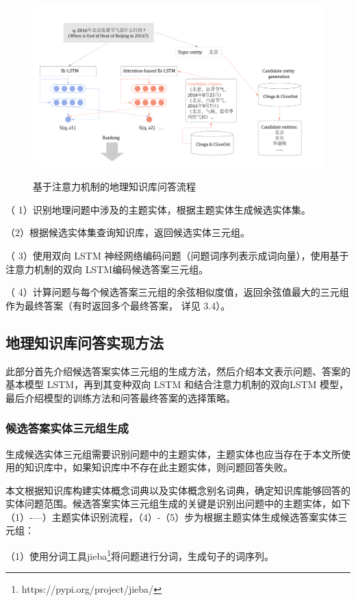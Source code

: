 \begin{figure}[!htb]
	\centering\includegraphics[height=7cm]{resource/qa_overview}
	\caption{基于注意力机制的地理知识库问答流程}
	\label{fig:qa_overview}
\end{figure}

（ 1）识别地理问题中涉及的主题实体，根据主题实体生成候选实体集。

（2）根据候选实体集查询知识库，返回候选实体三元组。

（ 3）使用双向 LSTM 神经网络编码问题（问题词序列表示成词向量），使用基于注意力机制的双向 LSTM编码候选答案三元组。

（ 4）计算问题与每个候选答案三元组的余弦相似度值，返回余弦值最大的三元组作为最终答案（有时返回多个最终答案， 详见 3.4）。

\subsection{地理知识库问答实现方法}
此部分首先介绍候选答案实体三元组的生成方法，然后介绍本文表示问题、答案的基本模型 LSTM，再到其变种双向 LSTM 和结合注意力机制的双向LSTM 模型，最后介绍模型的训练方法和问答最终答案的选择策略。

\subsubsection{候选答案实体三元组生成}
生成候选实体三元组需要识别问题中的主题实体，主题实体也应当存在于本文所使用的知识库中，如果知识库中不存在此主题实体，则问题回答失败。

本文根据知识库构建实体概念词典以及实体概念别名词典，确定知识库能够回答的实体问题范围。候选答案实体三元组生成的关键是识别出问题中的主题实体，如下（1）-—）主题实体识别流程，（4）-（5）步为根据主题实体生成候选答案实体三元组：

（1）使用分词工具jieba\footnote{https://pypi.org/project/jieba/}将问题进行分词，生成句子的词序列。

